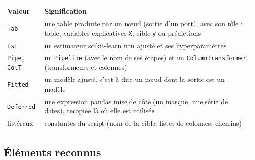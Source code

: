 \documentclass[11pt,a4paper]{article}
\newcommand{\code}[1]{\texttt{#1}}
\begin{document}
\begin{center}
\begin{tabularx}{\linewidth}{lX}
  \toprule
  \textbf{Valeur} & \textbf{Signification} \\
  \midrule
  \code{Tab} & une table produite par un nœud (sortie d'un port), avec son rôle :
               table, variables explicatives \code{X}, cible \code{y} ou prédictions \\
  \code{Est} & un estimateur scikit-learn non ajusté et ses hyperparamètres \\
  \code{Pipe}, \code{ColT} & un \code{Pipeline} (avec le nom de ses étapes) et un
               \code{ColumnTransformer} (transformeurs et colonnes) \\
  \code{Fitted} & un modèle ajusté, c'est-à-dire un nœud dont la sortie est un modèle \\
  \code{Deferred} & une expression pandas mise de côté (un masque, une série de dates),
               recopiée là où elle est utilisée \\
  littéraux & constantes du script (nom de la cible, listes de colonnes, chemins) \\
  \bottomrule
\end{tabularx}
\end{center}

\subsection{Éléments reconnus}
\end{document}
